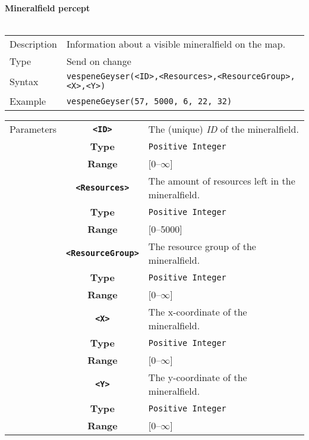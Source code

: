 \newpage
\noindent
\textbf{Mineralfield percept}\\
\\
\begin{tabularx}{\textwidth}{lX}
 Description & Information about a visible mineralfield on the map. \\
 Type & Send on change \\
 Syntax & \verb|vespeneGeyser(<ID>,<Resources>,<ResourceGroup>,<X>,<Y>)| \\
 Example & \verb|vespeneGeyser(57, 5000, 6, 22, 32)| \\ 
 \end{tabularx}
 \begin{tabularx}{\textwidth}{l | c | p{8cm}|}
 \cline{2-3} 
 Parameters & \textbf{\verb|<ID>|} & The (unique) \textit{ID} of the mineralfield.\\
            & \textbf{Type} & \verb|Positive Integer| \\
            & \textbf{Range} & [0--$\infty$] \\
            \cline{2-3} 
            & \textbf{\verb|<Resources>|} & The amount of resources left in the mineralfield.\\
            & \textbf{Type} & \verb|Positive Integer| \\
            & \textbf{Range} & [0--5000] \\
            \cline{2-3} 
            & \textbf{\verb|<ResourceGroup>|} & The resource group of the mineralfield. \\
            & \textbf{Type} & \verb|Positive Integer| \\
            & \textbf{Range} & [0--$\infty$] \\
            \cline{2-3} 
            & \textbf{\verb|<X>|} & The x-coordinate of the mineralfield.\\
            & \textbf{Type} & \verb|Positive Integer| \\
            & \textbf{Range} & [0--$\infty$] \\
            \cline{2-3} 
            & \textbf{\verb|<Y>|} & The y-coordinate of the mineralfield.\\
            & \textbf{Type} & \verb|Positive Integer| \\
            & \textbf{Range} & [0--$\infty$] \\
            \cline{2-3} 
\end{tabularx} \\

